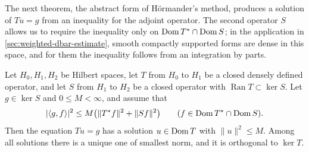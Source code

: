 The next theorem, the abstract form of H\"ormander's method, produces a solution of $Tu=g$ from an inequality for the adjoint operator. The second operator $S$ allows us to require the inequality only on $\operatorname{Dom} T^*\cap\operatorname{Dom} S$; in the application in \cref{sec:weighted-dbar-estimate}, smooth compactly supported forms are dense in this space, and for them the inequality follows from an integration by parts.

\begin{theorem}\label{thm:hilbert-complex-solvability}
Let $H_0,H_1,H_2$ be Hilbert spaces, let $T$ from $H_0$ to $H_1$ be a closed densely defined operator, and let $S$ from $H_1$ to $H_2$ be a closed operator with $\operatorname{Ran}T\subset\ker S$. Let $g\in\ker S$ and $0\le M<\infty$, and assume that
\[
 |\langle g,f\rangle|^2\le M\bigl(\|T^*f\|^2+\|Sf\|^2\bigr)
 \qquad(f\in\operatorname{Dom} T^*\cap\operatorname{Dom} S).
\]
Then the equation $Tu=g$ has a solution $u\in\operatorname{Dom} T$ with $\|u\|^2\le M$. Among all solutions there is a unique one of smallest norm, and it is orthogonal to $\ker T$.
\end{theorem}

